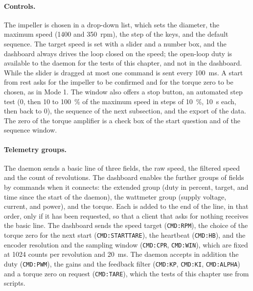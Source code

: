 \paragraph{Controls.}
The impeller is chosen in a drop-down list, which sets the diameter, the maximum speed (1400 and 350~rpm), the step of the keys, and the default sequence. The target speed is set with a slider and a number box, and the dashboard always drives the loop closed on the speed; the open-loop duty is available to the daemon for the tests of this chapter, and not in the dashboard. While the slider is dragged at most one command is sent every 100~ms. A start from rest asks for the impeller to be confirmed and for the torque zero to be chosen, as in Mode 1. The window also offers a stop button, an automated step test (0, then 10 to 100~\% of the maximum speed in steps of 10~\%, 10~s each, then back to 0), the sequence of the next subsection, and the export of the data. The zero of the torque amplifier is a check box of the start question and of the sequence window.

\paragraph{Telemetry groups.}
The daemon sends a basic line of three fields, the raw speed, the filtered speed and the count of revolutions. The dashboard enables the further groups of fields by commands when it connects: the extended group (duty in percent, target, and time since the start of the daemon), the wattmeter group (supply voltage, current, and power), and the torque. Each is added to the end of the line, in that order, only if it has been requested, so that a client that asks for nothing receives the basic line. The dashboard sends the speed target (\texttt{CMD:RPM}), the choice of the torque zero for the next start (\texttt{CMD:STARTTARE}), the heartbeat (\texttt{CMD:HB}), and the encoder resolution and the sampling window (\texttt{CMD:CPR}, \texttt{CMD:WIN}), which are fixed at 1024 counts per revolution and 20~ms. The daemon accepts in addition the duty (\texttt{CMD:PWM}), the gains and the feedback filter (\texttt{CMD:KP}, \texttt{CMD:KI}, \texttt{CMD:ALPHA}) and a torque zero on request (\texttt{CMD:TARE}), which the tests of this chapter use from scripts.

